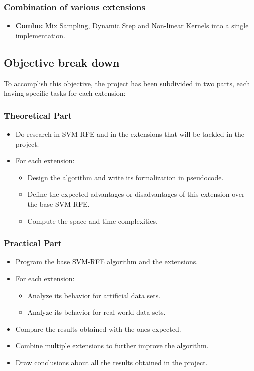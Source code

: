\subsubsection*{Combination of various extensions}

\begin{itemize}
    \item \textbf{Combo:} Mix Sampling, Dynamic Step and Non-linear Kernels into a single implementation.
\end{itemize}

\subsection{Objective break down}

To accomplish this objective, the project has been sub\-divided in two parts, each having specific tasks for each extension:

\subsubsection*{Theoretical Part}

\begin{itemize}
    \item Do research in SVM-RFE and in the extensions that will be tackled in the project.
    \item {
        For each extension:
        \begin{itemize}
            \item Design the algorithm and write its formalization in pseudocode.
            \item Define the expected advantages or disadvantages of this extension over the base SVM-RFE.
            \item Compute the space and time complexities.
        \end{itemize}
    }
\end{itemize}

\subsubsection*{Practical Part}

\begin{itemize}
    \item Program the base SVM-RFE algorithm and the extensions.
    \item {
        For each extension:
        \begin{itemize}
            \item Analyze its behavior for artificial data sets.
            \item Analyze its behavior for real-world data sets.
        \end{itemize}
    }
    \item Compare the results obtained with the ones expected.
    \item Combine multiple extensions to further improve the algorithm.
    \item Draw conclusions about all the results obtained in the project.
\end{itemize}

